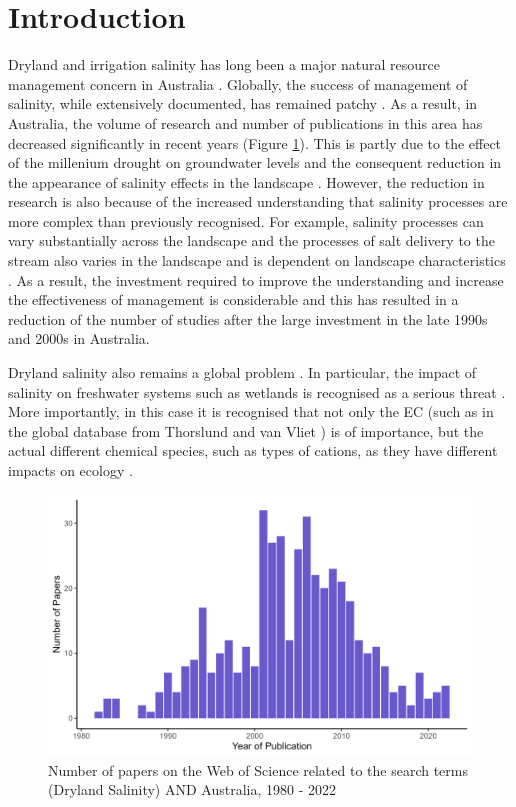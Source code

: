 \documentclass[, manuscript]{copernicus}
\begin{document}
\section{Introduction}

Dryland and irrigation salinity has long been a major natural resource
management concern in Australia
\citep{Jolly2001, White2009, Scanlon2007, Walker2002, Finlayson2010}.
Globally, the success of management of salinity, while extensively
documented, has remained patchy \citep{Leblanc2012}. As a result, in
Australia, the volume of research and number of publications in this
area has decreased significantly in recent years (Figure
\ref{fig:SalinityPapers}). This is partly due to the effect of the
millenium drought on groundwater levels and the consequent reduction in
the appearance of salinity effects in the landscape
\citep{mcfarlane2016}. However, the reduction in research is also
because of the increased understanding that salinity processes are more
complex than previously recognised. For example, salinity processes can
vary substantially across the landscape \citep{Conyers2008} and the
processes of salt delivery to the stream also varies in the landscape
\citep{Summerell2006, Hughes2007} and is dependent on landscape
characteristics \citep{vanDijk2008, Dalhaus2010}. As a result, the
investment required to improve the understanding and increase the
effectiveness of management is considerable and this has resulted in a
reduction of the number of studies after the large investment in the
late 1990s and 2000s in Australia.

Dryland salinity also remains a global problem
\citep{thorslund_vanvliet2020, stavi2021, mcfarlane2016}. In particular,
the impact of salinity on freshwater systems such as wetlands is
recognised as a serious threat \citep{canedoarguelles2016_science}. More
importantly, in this case it is recognised that not only the EC (such as
in the global database from Thorslund and van Vliet
\citeyearpar{thorslund_vanvliet2020}) is of importance, but the actual
different chemical species, such as types of cations, as they have
different impacts on ecology \citep{canedoarguelles2016_science}.

\begin{figure}
\includegraphics[width=0.8\linewidth]{Figures/Dryland Salinity Papers} \caption{Number of papers on the Web of Science related to the search terms (Dryland Salinity) AND Australia, 1980 - 2022}\label{fig:SalinityPapers}
\end{figure}
\end{document}
